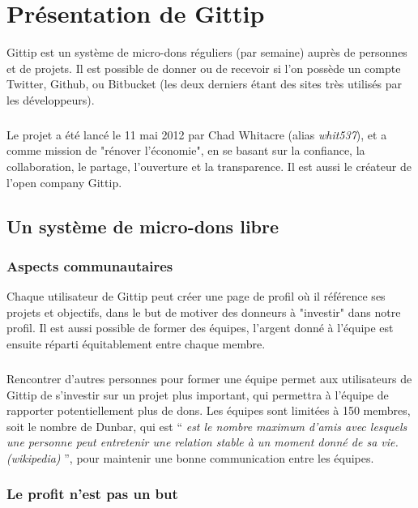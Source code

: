 \chapter{Présentation de Gittip}

Gittip est un système de micro-dons réguliers (par semaine) auprès de personnes
et de projets. Il est possible de donner ou de recevoir si l'on possède un
compte Twitter, Github, ou Bitbucket (les deux derniers étant des sites très
utilisés par les développeurs).

\paragraph{}
Le projet a été lancé le 11 mai 2012 par Chad Whitacre (alias \emph{whit537}),
et a comme mission de "rénover l'économie", en se basant sur la confiance, la
collaboration, le partage, l'ouverture et la transparence. Il est aussi le
créateur de l'open company Gittip.


    \section{Un système de micro-dons libre}

    \subsection{Aspects communautaires}

Chaque utilisateur de Gittip peut créer une page de profil où il référence ses
projets et objectifs, dans le but de motiver des donneurs à "investir" dans
notre profil. Il est aussi possible de former des équipes, l'argent donné à
l'équipe est ensuite réparti équitablement entre chaque membre.

\paragraph{}
Rencontrer d'autres personnes pour former une équipe permet aux utilisateurs de
Gittip de s'investir sur un projet plus important, qui permettra à l'équipe de
rapporter potentiellement plus de dons. Les équipes sont limitées à 150
membres, soit le nombre de Dunbar, qui est `` \emph{est le nombre maximum
d'amis avec lesquels une personne peut entretenir une relation stable à un
moment donné de sa vie. (wikipedia)} '', pour maintenir une bonne communication
entre les équipes.

    \subsection{Le profit n'est pas un but}

